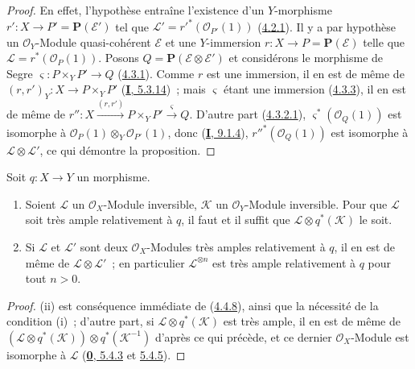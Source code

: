 \begin{proof}
En effet, l'hypothèse entraîne l'existence d'un $Y$-morphisme
$r':X\to P'=\mathbf{P}(\mathcal{E}')$ tel que
$\mathcal{L}'=r'^*(\mathcal{O}_{P'}(1))$
(\hyperref[II.4.2.1-fr]{4.2.1}). Il y a par hypothèse un
$\mathcal{O}_Y$-Module quasi-cohérent $\mathcal{E}$ et une
$Y$-immersion $r:X\to P=\mathbf{P}(\mathcal{E})$ telle que
$\mathcal{L}=r^*(\mathcal{O}_P(1))$. Posons
$Q=\mathbf{P}(\mathcal{E}\otimes\mathcal{E}')$ et considérons le morphisme de
Segre $\varsigma:P\times_YP'\to Q$ (\hyperref[II.4.3.1-fr]{4.3.1}). Comme
$r$ est une immersion, il en est de même de
$(r,r')_Y:X\to P\times_YP'$ (\hyperref[I.5.3.14-fr]{\textbf{I}, 5.3.14})~; mais
$\varsigma$ étant une immersion (\hyperref[II.4.3.3-fr]{4.3.3}), il en est de
même de
$r'':X\xrightarrow{(r,r')}P\times_YP'\xrightarrow{\varsigma}Q$. D'autre
part (\hyperref[II.4.3.2.1-fr]{4.3.2.1}),
$\varsigma^*(\mathcal{O}_Q(1))$ est isomorphe à
$\mathcal{O}_P(1)\otimes_Y\mathcal{O}_{P'}(1)$, donc
(\hyperref[I.9.1.4-fr]{\textbf{I}, 9.1.4}), $r''^*(\mathcal{O}_Q(1))$ est isomorphe à
$\mathcal{L}\otimes\mathcal{L}'$, ce qui démontre la proposition.
\end{proof}

\begin{corollary}[4.4.9]
\label{II.4.4.9-fr}
Soit $q:X\to Y$ un morphisme.
\begin{enumerate}
  \item[\rm{(i)}] Soient $\mathcal{L}$ un $\mathcal{O}_X$-Module inversible,
  $\mathcal{K}$ un $\mathcal{O}_Y$-Module inversible. Pour que $\mathcal{L}$
  soit très ample relativement à $q$, il faut et il suffit que
  $\mathcal{L}\otimes q^*(\mathcal{K})$ le soit.
  \item[\rm{(ii)}] Si $\mathcal{L}$ et $\mathcal{L}'$ sont deux
  $\mathcal{O}_X$-Modules très amples relativement à $q$, il en est de même
  de $\mathcal{L}\otimes\mathcal{L}'$~; en particulier
  $\mathcal{L}^{\otimes n}$ est très ample relativement à $q$ pour tout
  $n>0$.
\end{enumerate}
\end{corollary}

\begin{proof}
(ii) est conséquence immédiate de (\hyperref[II.4.4.8-fr]{4.4.8}), ainsi que
la nécessité de la condition (i)~; d'autre part, si
$\mathcal{L}\otimes q^*(\mathcal{K})$ est très ample, il en est de même de
$(\mathcal{L}\otimes q^*(\mathcal{K}))\otimes q^*(\mathcal{K}^{-1})$
d'après ce qui précède, et ce dernier $\mathcal{O}_X$-Module est isomorphe à
$\mathcal{L}$ (\hyperref[0.5.4.3-fr]{\textbf{0}, 5.4.3} et
\hyperref[0.5.4.5-fr]{5.4.5}).
\end{proof}

